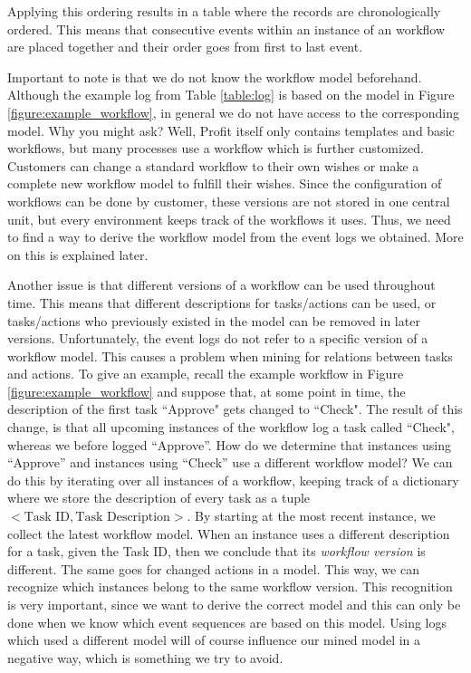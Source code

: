 \documentclass[a4paper,11pt]{article}
\begin{document}
Applying this ordering results in a table where the records are chronologically ordered. This means that consecutive events within an instance of an workflow are placed together and their order goes from first to last event. 

Important to note is that we do not know the workflow model beforehand. Although the example log from Table \ref{table:log} is based on the model in Figure \ref{figure:example_workflow}, in general we do not have access to the corresponding model. Why you might ask? Well, Profit itself only contains templates and basic workflows, but many processes use a workflow which is further customized. Customers can change a standard workflow to their own wishes or make a complete new workflow model to fulfill their wishes. Since the configuration of workflows can be done by customer, these versions are not stored in one central unit, but every environment keeps track of the workflows it uses. Thus, we need to find a way to derive the workflow model from the event logs we obtained. More on this is explained later.

Another issue is that different versions of a workflow can be used throughout time. This means that different descriptions for tasks/actions can be used, or tasks/actions who previously existed in the model can be removed in later versions. Unfortunately, the event logs do not refer to a specific version of a workflow model. This causes a problem when mining for relations between tasks and actions. To give an example, recall the example workflow in Figure \ref{figure:example_workflow} and suppose that, at some point in time, the description of the first task ``Approve" gets changed to ``Check". The result of this change, is that all upcoming instances of the workflow log a task called ``Check", whereas we before logged ``Approve''. How do we determine that instances using ``Approve'' and instances using ``Check'' use a different workflow model? We can do this by iterating over all instances of a workflow, keeping track of a dictionary where we store the description of every task as a tuple $<\text{Task ID}, \text{Task Description}>$. By starting at the most recent instance, we collect the latest workflow model. When an instance uses a different description for a task, given the Task ID, then we conclude that its \textit{workflow version} is different. The same goes for changed actions in a model. This way, we can recognize which instances belong to the same workflow version. This recognition is very important, since we want to derive the correct model and this can only be done when we know which event sequences are based on this model. Using logs which used a different model will of course influence our mined model in a negative way, which is something we try to avoid.
\end{document}
